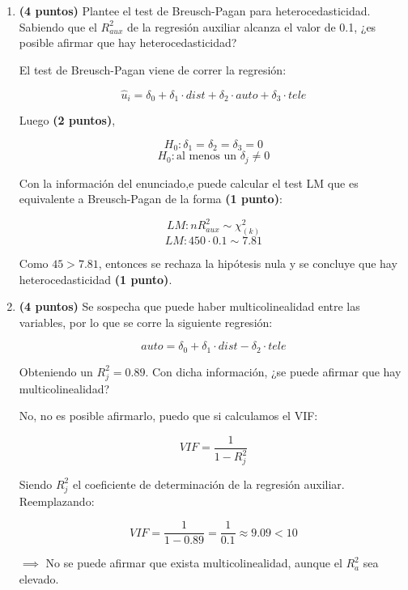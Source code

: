 \documentclass[10pt,a4paper]{article}
\begin{document}
\begin{enumerate}
\begin{enumerate}
{Utilizando errores estándar robustos la variable distancia al trabajo no es estadísticamente distinta de cero, puesto que su $t \; estadístico$ es menor que 1,96, mientras que $auto$ y $tele$ sí lo son. \textbf{(3 puntos)}. 
}

\item \textbf{(4 puntos)} Plantee el test de Breusch-Pagan para heterocedasticidad. Sabiendo que el $R_{aux}^2$ de la regresión auxiliar alcanza el valor de 0.1, ¿es posible afirmar que hay heterocedasticidad?

{\color{blue} El test de Breusch-Pagan viene de correr la regresión:

$$\hat{u}_i = \delta_0 + \delta_1 \cdot dist + \delta_2 \cdot auto + \delta_3 \cdot tele$$

Luego \textbf{(2 puntos)}, 

$$H_0: \delta_1 = \delta_2 = \delta_3 = 0$$
$$H_0: \text{al menos un } \delta_j \neq 0$$

Con la información del enunciado,e puede calcular el test LM que es equivalente a Breusch-Pagan de la forma \textbf{(1 punto)}:

$$LM: n R_{aux}^2 \sim \chi^2_{(k)}$$
$$LM: 450 \cdot 0.1 \sim 7.81$$

Como $45 > 7.81$, entonces se rechaza la hipótesis nula y se concluye que hay heterocedasticidad \textbf{(1 punto)}.}

\item \textbf{(4 puntos)} Se sospecha que puede haber multicolinealidad entre las variables, por lo que se corre la siguiente regresión:

$$auto = \delta_0 + \delta_1 \cdot dist - \delta_2 \cdot tele$$

Obteniendo un $R_j^2 = 0.89$. Con dicha información, ¿se puede afirmar que hay multicolinealidad?

{\color{blue}

No, no es posible afirmarlo, puedo que si calculamos el VIF:

$$VIF = \frac{1}{1 - R_j^2}$$

Siendo $R_j^2$ el coeficiente de determinación de la regresión auxiliar. Reemplazando:

$$VIF = \frac{1}{1 - 0.89} = \frac{1}{0.1} \approx 9.09 < 10$$

$\implies$ No se puede afirmar que exista multicolinealidad, aunque el $R_a^2$ sea elevado.}

\end{enumerate}
\end{enumerate}
\end{document}
